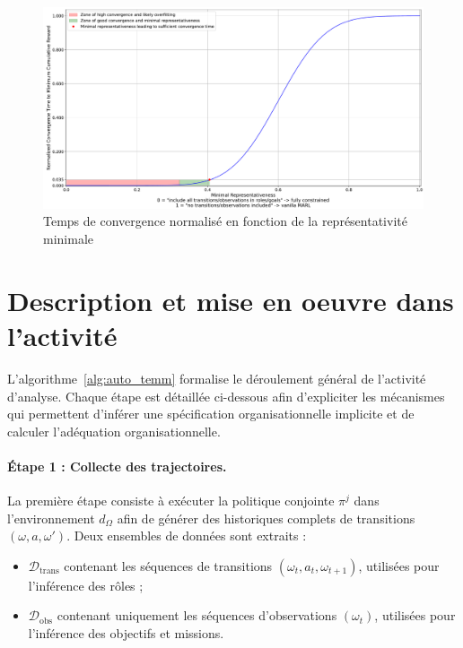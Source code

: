 \begin{figure}[h!]
    \centering
    \includegraphics[trim=0cm 0cm 0cm 0cm, clip, width=1.\linewidth]{figures/convergence_time_relative_to_representativeness.pdf}
    \caption{Temps de convergence normalisé en fonction de la représentativité minimale}
    \label{fig:conv_time_repr}
\end{figure}




\section{Description et mise en oeuvre dans l'activité}

L’algorithme~\ref{alg:auto_temm} formalise le déroulement général de l’activité d’analyse.
Chaque étape est détaillée ci-dessous afin d’expliciter les mécanismes qui permettent d’inférer une spécification organisationnelle implicite et de calculer l’adéquation organisationnelle.

\paragraph{Étape 1 : Collecte des trajectoires.}
La première étape consiste à exécuter la politique conjointe $\pi^j$ dans l’environnement $d_\Omega$ afin de générer des historiques complets de transitions $(\omega, a, \omega')$.
Deux ensembles de données sont extraits :
\begin{itemize}
    \item $\mathcal{D}_{\text{trans}}$ contenant les séquences de transitions $(\omega_t, a_t, \omega_{t+1})$, utilisées pour l’inférence des rôles ;
    \item $\mathcal{D}_{\text{obs}}$ contenant uniquement les séquences d’observations $(\omega_t)$, utilisées pour l’inférence des objectifs et missions.
\end{itemize}

